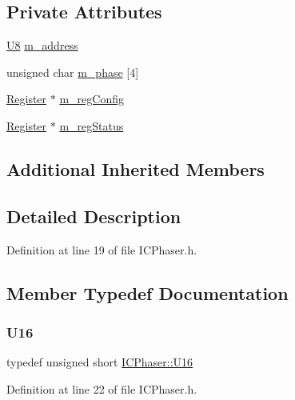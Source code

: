 \subsection*{Private Attributes}
\begin{DoxyCompactItemize}
\item 
\hyperlink{classICPhaser_a4f9b2302efbd7bdd70d7d80b415f1a9d}{U8} \hyperlink{classICPhaser_a2b3bdff684521d2c3d053662134043ca}{m\+\_\+address}
\item 
unsigned char \hyperlink{classICPhaser_afe2a4527d58d08342d631dfa7c731203}{m\+\_\+phase} \mbox{[}4\mbox{]}
\item 
\hyperlink{classRegister}{Register} $\ast$ \hyperlink{classICPhaser_af135fe05b7c087639789afe470e88ce4}{m\+\_\+reg\+Config}
\item 
\hyperlink{classRegister}{Register} $\ast$ \hyperlink{classICPhaser_adcc37517abf1390407003c387008262d}{m\+\_\+reg\+Status}
\end{DoxyCompactItemize}
\subsection*{Additional Inherited Members}


\subsection{Detailed Description}


Definition at line 19 of file I\+C\+Phaser.\+h.



\subsection{Member Typedef Documentation}
\mbox{\label{classICPhaser_a66a90f8d7b28e695c98dbca784a57c8b}} 
\subsubsection{\texorpdfstring{U16}{U16}}
{\footnotesize\ttfamily typedef unsigned short \hyperlink{classICPhaser_a66a90f8d7b28e695c98dbca784a57c8b}{I\+C\+Phaser\+::\+U16}}



Definition at line 22 of file I\+C\+Phaser.\+h.

\mbox{\label{classICPhaser_ae7a88b0c8e5ce2b7406c0e6bcd6f2a24}} 
